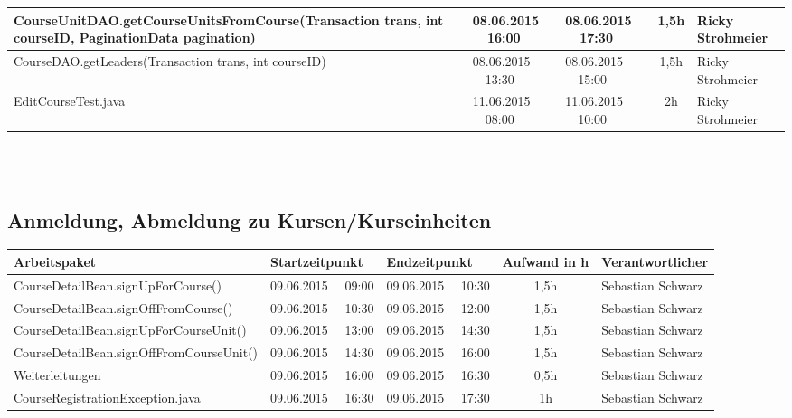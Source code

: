 \begin{landscape}
\begin{tabular}{|p{10.3cm}|p{3.2cm}|p{3.2cm}|c|p{3.5cm}|}
		\hline   CourseUnitDAO.getCourseUnitsFromCourse(Transaction trans, int courseID, PaginationData pagination) & 08.06.2015 \ \ 16:00       & 08.06.2015  \ \  17:30      &  1,5h              & Ricky Strohmeier\\
		\hline   CourseDAO.getLeaders(Transaction trans, int courseID)    & 08.06.2015 \ \ 13:30       & 08.06.2015  \ \  15:00      &  1,5h              & Ricky Strohmeier\\
		\hline   EditCourseTest.java              & 11.06.2015 \ \ 08:00     & 11.06.2015 \ \ 10:00     &      2h               & Ricky Strohmeier\\ 
		\hline 
	\end{tabular} \ \\
	\ \\
	
	\subsection{Anmeldung, Abmeldung zu Kursen/Kurseinheiten}
	\begin{tabular}{|p{10.3cm}|p{3.2cm}|p{3.2cm}|c|p{3.5cm}|}
		\hline  \textbf{Arbeitspaket} & \textbf{Startzeitpunkt} & \textbf{Endzeitpunkt} & \textbf{Aufwand in h} & \textbf{Verantwortlicher} \\ 
		\hline   CourseDetailBean.signUpForCourse()                          & 09.06.2015 \ \ 09:00       & 09.06.2015 \ \ 10:30        & 1,5h                 & Sebastian Schwarz\\
		\hline   CourseDetailBean.signOffFromCourse()                        & 09.06.2015 \ \ 10:30       & 09.06.2015 \ \ 12:00        & 1,5h                 & Sebastian Schwarz\\
		\hline   CourseDetailBean.signUpForCourseUnit()                      & 09.06.2015 \ \ 13:00       & 09.06.2015 \ \ 14:30        & 1,5h                 & Sebastian Schwarz\\
		\hline   CourseDetailBean.signOffFromCourseUnit()                    & 09.06.2015 \ \ 14:30       & 09.06.2015 \ \ 16:00        & 1,5h                 & Sebastian Schwarz\\
		\hline   Weiterleitungen                                             & 09.06.2015 \ \ 16:00       & 09.06.2015 \ \ 16:30        & 0,5h                 & Sebastian Schwarz\\
		\hline   CourseRegistrationException.java                            & 09.06.2015 \ \ 16:30       & 09.06.2015 \ \ 17:30        & 1h                 & Sebastian Schwarz\\

\end{tabular}
\end{landscape}
